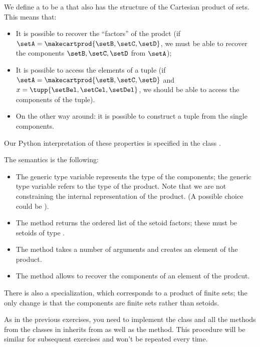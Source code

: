 
We define a  to be a \Setoid that also has the structure of the Cartesian product of sets.
This means that:
\begin{itemize}
    \item It is possible to recover the ``factors'' of the prodct (if $\setA = \makecartprod{\setB, \setC, \setD}$, we must be able to recover the components $\setB, \setC, \setD$ from $\setA$);
    \item It is possible to access the elements of a tuple (if $\setA = \makecartprod{\setB, \setC, \setD}$ and $x = \tupp{\setBel, \setCel, \setDel}$, we should be able to access the components of the tuple).
    \item On the other way around: it is possible to construct a tuple from the single components.
\end{itemize}
Our Python interpretation of these properties is specified in the class .


The semantics is the following:
\begin{itemize}
    \item The generic type variable  represents the type of the components; the generic type variable 
          refers to the type of the product.
          Note that we are not constraining the internal representation of the product.
          (A possible choice could be ).
    \item The method  returns the ordered list of the setoid factors; these must be setoids of type .
    \item The method  takes a number of arguments and creates an element of the product.
    \item The method  allows to recover the components of an element of the prodcut.
\end{itemize}

There is also a specialization, which corresponds to a product of finite sets; the only change is that the components are finite sets rather than setoids.



As in the previous exercises, you need to implement the class  and all the methods from the classes in inherits from as well as the  method.
This procedure will be similar for subsequent exercises and won't be repeated every time.


